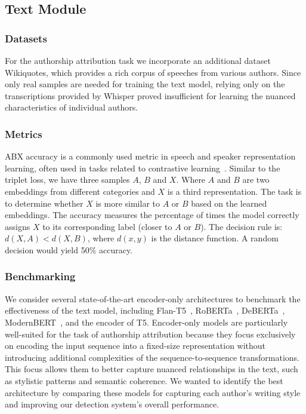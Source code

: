 \documentclass{Interspeech}
\begin{document}

\subsection{Text Module}

\subsubsection{Datasets}
For the authorship attribution task we incorporate an additional dataset
Wikiquotes, which provides a rich corpus of speeches from various authors.
Since only real samples are needed for training the text model, relying only on
the transcriptions provided by Whisper proved insufficient for learning the
nuanced characteristics of individual authors.

\subsubsection{Metrics}
ABX accuracy is a commonly used metric in speech and speaker representation
learning, often used in tasks related to contrastive learning~\cite{abx_speech_features, evaluatingcontextinvarianceunsupervisedspeech}. Similar to the
triplet loss, we have three samples $A$, $B$ and $X$. Where $A$ and $B$ are two embeddings
from different categories and $X$ is a third representation. The task is to
determine whether $X$ is more similar to $A$ or $B$ based on the learned embeddings.
The accuracy measures the percentage of times the model correctly assigns $X$ to
its corresponding label (closer to $A$ or $B$). The decision rule is: $d(X,A) <
  d(X,B)$, where $d(x,y)$ is the distance function. A random decision would yield 50\% accuracy.

\subsubsection{Benchmarking}
We consider several state-of-the-art encoder-only architectures to benchmark
the effectiveness of the text model, including Flan-T5~\cite{flan-t5},
RoBERTa~\cite{liu2019roberta}, DeBERTa~\cite{deberta},
ModernBERT~\cite{modernBERT}, and the encoder of T5\cite{t5}. Encoder-only
models are particularly well-suited for the task of authorship attribution
because they focus exclusively on encoding the input sequence into a fixed-size
representation without introducing additional complexities of the
sequence-to-sequence transformations. This focus allows them to better capture
nuanced relationships in the text, such as stylistic patterns and semantic
coherence. We wanted to identify the best architecture by comparing these
models for capturing each author's writing style and improving our detection
system's overall performance.
\end{document}
